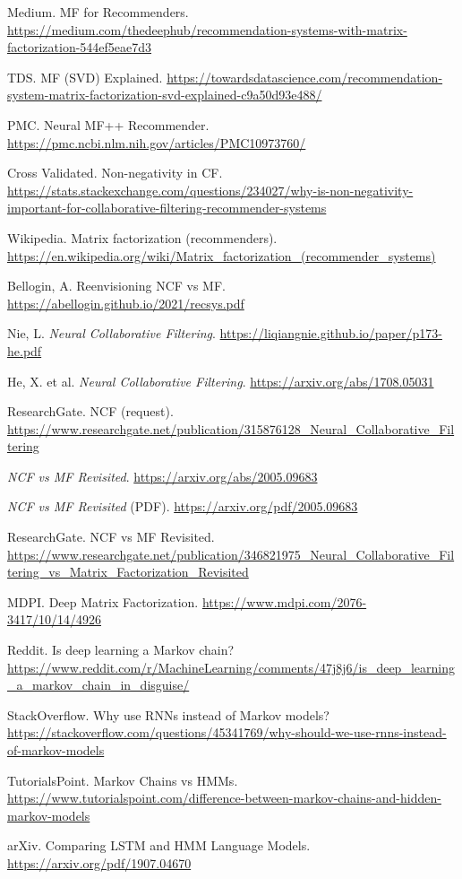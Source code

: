 \documentclass[11pt]{article}
\begin{document}
\begin{enumerate}[leftmargin=1.2em,label={[\arabic*]}]
\item Medium. MF for Recommenders. \url{https://medium.com/thedeephub/recommendation-systems-with-matrix-factorization-544ef5eae7d3}
\item TDS. MF (SVD) Explained. \url{https://towardsdatascience.com/recommendation-system-matrix-factorization-svd-explained-c9a50d93e488/}
\item PMC. Neural MF++ Recommender. \url{https://pmc.ncbi.nlm.nih.gov/articles/PMC10973760/}
\item Cross Validated. Non-negativity in CF. \url{https://stats.stackexchange.com/questions/234027/why-is-non-negativity-important-for-collaborative-filtering-recommender-systems}
\item Wikipedia. Matrix factorization (recommenders). \url{https://en.wikipedia.org/wiki/Matrix_factorization_(recommender_systems)}
\item Bellogin, A. Reenvisioning NCF vs MF. \url{https://abellogin.github.io/2021/recsys.pdf}
\item Nie, L. \emph{Neural Collaborative Filtering}. \url{https://liqiangnie.github.io/paper/p173-he.pdf}
\item He, X. et al. \emph{Neural Collaborative Filtering}. \url{https://arxiv.org/abs/1708.05031}
\item ResearchGate. NCF (request). \url{https://www.researchgate.net/publication/315876128_Neural_Collaborative_Filtering}
\item \emph{NCF vs MF Revisited}. \url{https://arxiv.org/abs/2005.09683}
\item \emph{NCF vs MF Revisited} (PDF). \url{https://arxiv.org/pdf/2005.09683}
\item ResearchGate. NCF vs MF Revisited. \url{https://www.researchgate.net/publication/346821975_Neural_Collaborative_Filtering_vs_Matrix_Factorization_Revisited}
\item MDPI. Deep Matrix Factorization. \url{https://www.mdpi.com/2076-3417/10/14/4926}
\item Reddit. Is deep learning a Markov chain? \url{https://www.reddit.com/r/MachineLearning/comments/47j8j6/is_deep_learning_a_markov_chain_in_disguise/}
\item StackOverflow. Why use RNNs instead of Markov models? \url{https://stackoverflow.com/questions/45341769/why-should-we-use-rnns-instead-of-markov-models}
\item TutorialsPoint. Markov Chains vs HMMs. \url{https://www.tutorialspoint.com/difference-between-markov-chains-and-hidden-markov-models}
\item arXiv. Comparing LSTM and HMM Language Models. \url{https://arxiv.org/pdf/1907.04670}

\end{enumerate}
\end{document}
